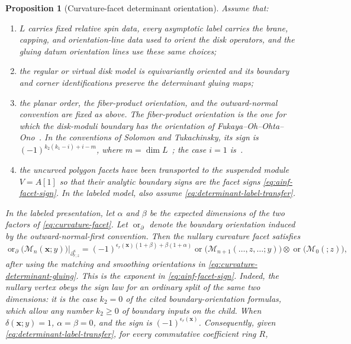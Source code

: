 \documentclass[11pt,letterpaper,twoside]{article}
\theoremstyle{plain}
\newtheorem{proposition}[theorem]{Proposition}
\theoremstyle{definition}
\theoremstyle{remark}
\let\cite\citep
\begin{document}
\begin{proposition}[Curvature-facet determinant orientation]\label{prop:curvature-orientation}
Assume that:
\begin{enumerate}[label=\textup{(\roman*)}]
\item $L$ carries fixed relative spin data, every asymptotic label carries the brane, capping, and orientation-line data used to orient the disk operators, and the gluing datum orientation lines use these same choices;
\item the regular or virtual disk model is equivariantly oriented and its boundary and corner identifications preserve the determinant gluing maps;
\item the planar order, the fiber-product orientation, and the outward-normal convention are fixed as above.  The fiber-product orientation is the one for which the disk-moduli boundary has the orientation of Fukaya--Oh--Ohta--Ono~\cite[Prop.~8.3.3]{fooo2009}.  In the conventions of Solomon and Tukachinsky, its sign is \((-1)^{k_2(k_1-i)+i-m}\), where \(m=\dim L\)~\cite[Prop.~2.8]{solomontukachinsky2022}; the case \(i=1\) is~\cite[Prop.~8.3.3]{fooo2009}.
\item the uncurved polygon facets have been transported to the suspended module $V=A[1]$ so that their analytic boundary signs are the facet signs \eqref{eq:ainf-facet-sign}.  In the labeled model, also assume \eqref{eq:determinant-label-transfer}.
\end{enumerate}
In the labeled presentation, let \(\alpha\) and \(\beta\) be the expected dimensions of the two factors of \eqref{eq:curvature-facet}.  Let \(\operatorname{or}_\partial\) denote the boundary orientation induced by the outward-normal-first convention.  Then the nullary curvature facet satisfies
\begin{equation}\label{eq:curvature-analytic-boundary-sign}
 \operatorname{or}_{\partial}
 \bigl(\mathcal M_n(\mathbf x;y)\bigr)
 \big|_{\partial^\kappa_{r;z}}
 =(-1)^{\epsilon_r(\mathbf x)(1+\beta)+\beta(1+\alpha)}
 \operatorname{or}\bigl(\mathcal M_{n+1}(\ldots,z,\ldots;y)\bigr)
 \otimes\operatorname{or}\bigl(\mathcal M_0(;z)\bigr),
\end{equation}
after using the matching and smoothing orientations in \eqref{eq:curvature-determinant-gluing}.  This is the exponent in \eqref{eq:ainf-facet-sign}.  Indeed, the nullary vertex obeys the sign law for an ordinary split of the same two dimensions: it is the case \(k_2=0\) of the cited boundary-orientation formulas, which allow any number \(k_2\geq0\) of boundary inputs on the child.  When \(\delta(\mathbf x;y)=1\), \(\alpha=\beta=0\), and the sign is \((-1)^{\epsilon_r(\mathbf x)}\).  Consequently, given \eqref{eq:determinant-label-transfer}, for every commutative coefficient ring $R$,

\end{proposition}
\end{document}
